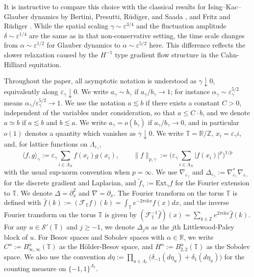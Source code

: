 \documentclass{article}
\begin{document}
It is instructive to compare this choice with the classical results for Ising--Kac--Glauber dynamics by Bertini, Presutti, Rüdiger, and Saada \cite{bertini1994}, and Fritz and Rüdiger \cite{fritz1995}. While the spatial scaling \(\gamma \sim \varepsilon^{3/4}\) and the fluctuation amplitude \(\delta\sim\varepsilon^{1/4}\) are the same as in that non-conservative setting, the time scale changes from \(\alpha\sim\varepsilon^{1/2}\) for Glauber dynamics to \(\alpha\sim\varepsilon^{5/2}\) here. This difference reflects the slower relaxation caused by the $H^{-1}$ type gradient flow structure in the Cahn-Hilliard equitation.

Throughout the paper, all asymptotic notation is understood as \(\gamma\downarrow0\), equivalently along \(\varepsilon_\gamma\downarrow0\).
We write \(a_\gamma\sim b_\gamma\) if
\(a_\gamma/b_\gamma\to1\); for instance \(\alpha_\gamma\sim\varepsilon_\gamma^{5/2}\) means \(\alpha_\gamma/\varepsilon_\gamma^{5/2}\to1\). 
We use the notation $a\lesssim b$ if there exists a constant $C>0$, independent of the variables under consideration, so that $a \leq C\cdot b$, and we denote $a\simeq b$ if $a\lesssim b$ and $b\lesssim a$. 
We write \(a_\gamma=o(b_\gamma)\) if
\(a_\gamma/b_\gamma\to0\), and in particular \(o(1)\) denotes a quantity which vanishes as \(\gamma\downarrow0\).
We write \(\mathbb T=\mathbb R/\mathbb Z\), \(x_i=\varepsilon_\gamma i\), and, for lattice functions on \(\Lambda_{\varepsilon_\gamma}\),
\[
\langle f,g\rangle_\gamma:=\varepsilon_\gamma\sum_{i\in\Lambda_N}f(x_i)g(x_i),
\qquad
\|f\|_{p,\gamma}:=\bigl(\varepsilon_\gamma\sum_{i\in\Lambda_N}|f(x_i)|^p\bigr)^{1/p}
\]
with the usual sup-norm convention when \(p=\infty\).  We use \(\nabla_{\varepsilon_\gamma}\) and \(\Delta_{\varepsilon_\gamma}:=\nabla_{\varepsilon_\gamma}^*\nabla_{\varepsilon_\gamma}\) for the discrete gradient and Laplacian, and \(\widetilde f_\gamma:=\mathrm{Ext}_\gamma f\) for the Fourier extension to \(\mathbb T\).
We denote $\Delta = \partial_x^2$ and $\nabla = \partial_x$.
The Fourier transform on the torus $\mathbb{T}$ is defined with $\hat{f}(k):=(\mathscr{F}_{\mathbb{T}}f)(k)= \int_{\mathbb{T}}e^{-2\pi i k x}f(x)dx$, and the inverse Fourier transform on the torus $\mathbb{T}$ is given by $(\mathscr{F}^{-1}_{\mathbb{T}}\hat{f})(x) = \sum_{k \in \mathbb{Z}}e^{2\pi i kx}\hat{f}(k)$. 
For any $u \in \mathcal{S}'(\mathbb{T})$ and $j\geq -1$, we denote $\Delta_{j}u$ as the $j$th Littlewood-Paley block of $u$. For Besov spaces and Sobolev spaces with $\alpha \in \mathbb R$, we write $C^{\alpha}:=B^{\alpha}_{\infty,\infty}(\mathbb{T})$ as the H\"{o}lder-Besov space, and $H^{\alpha} := B^{\alpha}_{2,2}(\mathbb{T})$ as the Sobolev space. We also use the convention
\(
d\eta
:=
\prod_{u\in\Lambda_\ell}
\bigl(\delta_{-1}(d\eta_u)+\delta_1(d\eta_u)\bigr)
\)
for the counting measure on \(\{-1,1\}^{\Lambda_\ell}\).
\end{document}
